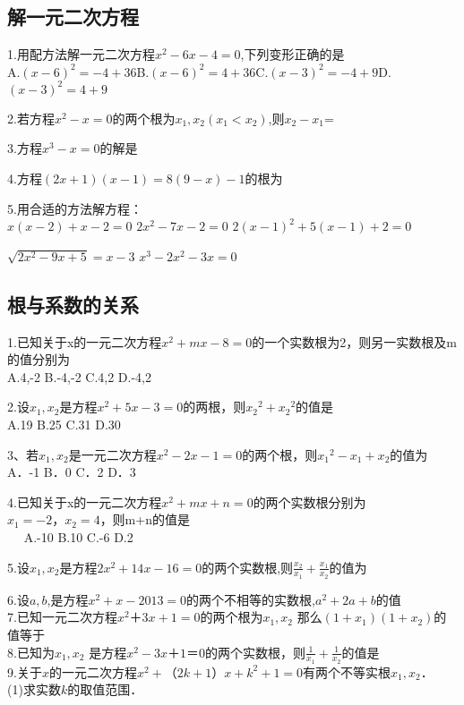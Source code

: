 \subsection{解一元二次方程}
1.用配方法解一元二次方程$x^2-6x-4=0$,下列变形正确的是\\
A.$(x-6)^2=-4+36$\hfill B.$(x-6)^2=4+36$\hfill C.$(x-3)^2=-4+9$\hfill D.$(x-3)^2=4+9$ \hfill  

2.若方程$x^2-x=0$的两个根为$x_1,x_2(x_1<x_2)$,则$x_2-x_1$=

3.方程$x^3-x=0$的解是

4.方程$(2x+1)(x-1)=8(9-x)-1$的根为

5.用合适的方法解方程：\\
$x(x-2)+x-2=0$  \hspace{2cm}   $2x^2-7x-2=0$ \hspace{2cm}  $2(x-1)^2+5(x-1)+2=0$\\
\vspace{2cm}

$\sqrt{2x^2-9x+5}=x-3 $  \hspace{2cm}  $x^3-2x^2-3x=0$  \hspace{2cm} \\ 

\subsection{根与系数的关系}
1.已知关于x的一元二次方程$x^2+mx-8=0$的一个实数根为2，则另一实数根及m的值分别为\\
A.4,-2  \hfill   B.-4,-2  \hfill  C.4,2 \hfill D.-4,2\par
2.设$x_1,x_2$是方程$x^2+5x-3=0$的两根，则${x_2}^2+{x_2}^2$的值是\\
A.19 \hfill  B.25   \hfill  C.31  \hfill  D.30  \par

3、若$x_1,x_2$是一元二次方程$x^2-2x-1=0$的两个根，则${x_1}^2-x_1+x_2$的值为\\
A．-1 \hfill B．0      \hfill     C．2  \hfill      D．3 \par
4.已知关于x的一元二次方程$x^2+mx+n=0$的两个实数根分别为$x_1=-2，x_2=4$，则m+n的值是\\
　	A.-10 \hfill B.10 \hfill	C.-6	\hfill D.2  \par
5.设$x_1,x_2$是方程$2x^2+14x-16=0$的两个实数根,则$\frac{x_2}{x_1}+\frac{x_1}{x_2} $的值为\par
6.设$a,b$,是方程$x^2+x-2013=0$的两个不相等的实数根,$a^2+2a+b$的值\\
7.已知一元二次方程$x^2＋3x+1=0$的两个根为$x_1,x_2$ 那么$(1+x_1)(1+x_2)$的值等于\\
8.已知为$x_1,x_2$ 是方程$x^2-3x＋1＝0$的两个实数根，则$\frac{1}{x_1}+\frac{1}{x_2} $的值是\\
9.关于$x$的一元二次方程$x^2+（2k+1）x+k^2+1=0$有两个不等实根$x_1,x_2$．\\
(1)求实数$k$的取值范围．\\
\vspace{2cm}

